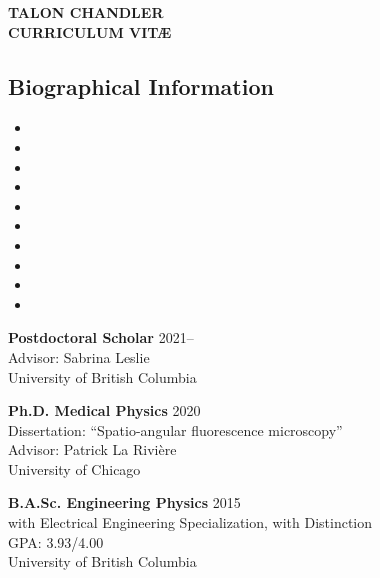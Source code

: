 \documentclass[12pt,letterpaper]{article}
\begin{document}
\begin{center}
{\Large \textbf{TALON CHANDLER}}\\
{\textbf{CURRICULUM VIT\AE}}\\
\end{center}

\vspace{-1em}

\subsection*{Biographical Information}
\begin{itemize}[noitemsep]
\item[]  
\item[]  
\item[]  
\item[] \itab{} 
\item[] \itab{} 
\item[]  
\item[]  
\item[]  
\item[]  
\item[] \itab{} 
\end{itemize}

\begin{benumerate}{1}
  \item[] \textbf{Postdoctoral Scholar} \hfill 2021--\\
  Advisor: Sabrina Leslie \\
  University of British Columbia
\end{benumerate}

\begin{benumerate}{2}
\item
  \textbf{Ph.D. Medical Physics} \hfill 2020\\
  Dissertation: ``Spatio-angular fluorescence microscopy''\\
  Advisor: Patrick La Rivi\`ere \\
  University of Chicago
\item
  \textbf{B.A.Sc. Engineering Physics} \hfill 2015\\
  with Electrical Engineering Specialization, with Distinction\\
  GPA: 3.93/4.00\\
  University of British Columbia
\end{benumerate}
\end{document}
